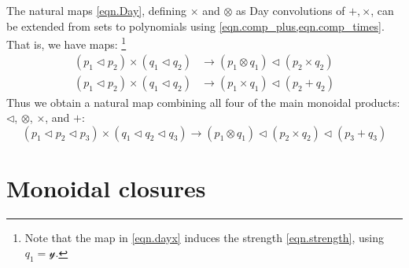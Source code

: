 \documentclass[11pt, one side, article]{memoir}
\newcommand{\myred}[1]{{\color{red!60!black}#1}}
\newcommand{\mygreen}[1]{{\color{green!40!black}#1}}
\theoremstyle{definition}
\theoremstyle{plain}
\newcommand{\Cat}[1]{\mathbf{#1}}%
\newcommand{\nn}{\mathbb{N}}
\newcommand{\yon}{{\mathcal{y}}}
\newcommand{\poly}{\Cat{Poly}}
\newcommand{\0}{\textsf{0}}
\newcommand{\1}{\tn{\textsf{1}}}
\newcommand{\tri}{\mathbin{\triangleleft}}
\begin{document}
The natural maps \eqref{eqn.Day}, defining $\times$ and $\otimes$ as Day convolutions of $+,\times$, can be extended from sets to polynomials using \cref{eqn.comp_plus,eqn.comp_times}. That is, we have maps:%
\footnote{Note that the map in \eqref{eqn.dayx} induces the strength \eqref{eqn.strength}, using $q_1=\yon$.}
\begin{align}
\label{eqn.dayx}
	(p_1\tri p_2)\times(q_1\tri q_2)&\to(p_1\otimes q_1)\tri(p_2\times q_2)\\
\label{eqn.day+}
	(p_1\tri p_2)\times(q_1\tri q_2)&\to(p_1\times q_1)\tri(p_2+q_2)
\end{align}
Thus we obtain a natural map combining all four of the main monoidal products: $\tri$, $\otimes$, $\times$, and $+$:
\begin{equation}\label{eqn.allfour}
	(p_1\tri p_2\tri p_3)\times(q_1\tri q_2\tri q_3)\to (p_1\otimes q_1)\tri (p_2\times q_2)\tri(p_3+q_3)
\end{equation}


\chapter{Monoidal closures}
\end{document}
